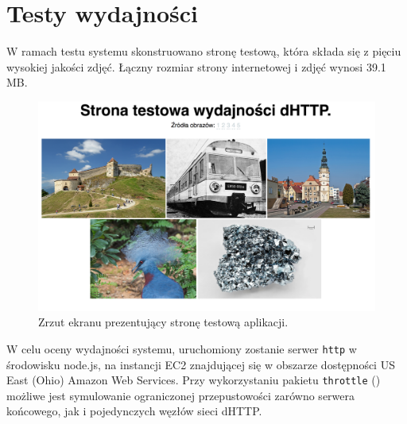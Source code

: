 \chapter{Testy wydajności}
\label{cha:testyIOptymalizacje}

W ramach testu systemu skonstruowano stronę testową, która składa się z pięciu wysokiej jakości zdjęć. Łączny rozmiar strony internetowej i zdjęć wynosi 39.1 MB.

\begin{figure}[h]
    \centering
    \includegraphics[scale=0.3]{perf-page.png}

    \caption{Zrzut ekranu prezentujący stronę testową aplikacji.}
    \label{fig:test-page}
\end{figure}

W celu oceny wydajności systemu, uruchomiony zostanie serwer \texttt{http} w środowisku node.js, na instancji EC2 znajdującej się w obszarze dostępności US East (Ohio) Amazon Web Services. Przy wykorzystaniu pakietu \texttt{throttle} (\cite{npmThrottle}) możliwe jest symulowanie ograniczonej przepustowości zarówno serwera końcowego, jak i pojedynczych węzłów sieci dHTTP.

